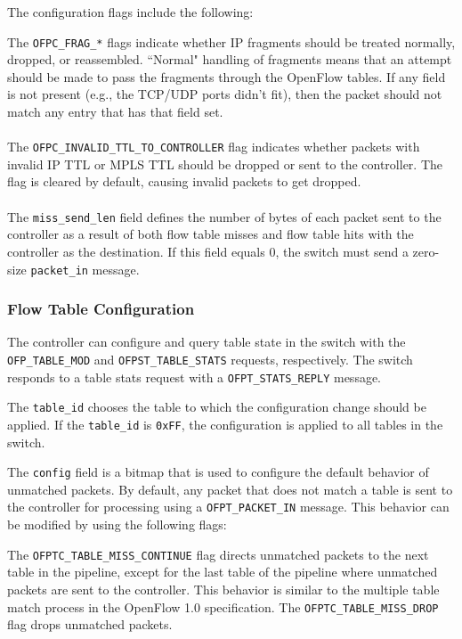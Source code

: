 
The configuration flags include the following:


The \verb|OFPC_FRAG_*| flags indicate whether IP fragments should be treated normally, dropped, or reassembled.  ``Normal" handling of fragments means that an attempt should be made to pass the fragments through the OpenFlow tables. If any field is not present (e.g., the TCP/UDP ports didn't fit), then the packet should not match any entry that has that field set.
\\\\
The \verb|OFPC_INVALID_TTL_TO_CONTROLLER| flag indicates whether packets with invalid IP TTL or MPLS TTL should be dropped or sent to the controller.  The flag is cleared by default, causing invalid packets to get dropped.
\\\\
The \verb|miss_send_len| field defines the number of bytes of each packet sent to the controller as a result of both flow table misses and flow table hits with the controller as the destination.  If this field equals 0, the switch must send a zero-size \verb|packet_in| message.

\subsubsection{Flow Table Configuration}
The controller can configure and query table state in the switch with the \verb|OFP_TABLE_MOD| and \verb|OFPST_TABLE_STATS| requests, respectively. The switch responds to a table stats request with a \verb|OFPT_STATS_REPLY| message.


The \verb|table_id| chooses the table to which the configuration change should be applied. If the \verb|table_id| is \verb|0xFF|, the configuration is applied to all tables in the switch.

The \verb|config| field is a bitmap that is used to configure the default behavior of unmatched packets.  By default, any packet that does not match a table is sent to the controller for processing using a \verb|OFPT_PACKET_IN| message.  This behavior can be modified by using the following flags:


The \verb|OFPTC_TABLE_MISS_CONTINUE| flag directs unmatched packets to the next table in the pipeline, except for the last table of the pipeline where unmatched packets are sent to the controller.  This behavior is similar to the multiple table match process in the OpenFlow 1.0 specification. The \verb|OFPTC_TABLE_MISS_DROP| flag drops unmatched packets.

